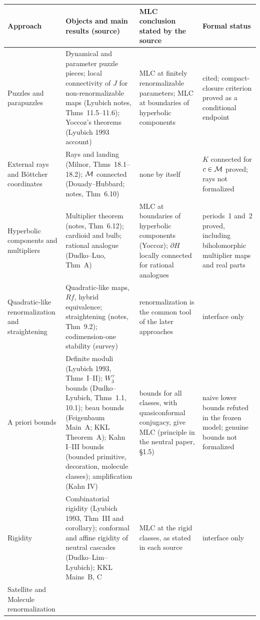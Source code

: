 \begin{table}[ht]
\centering\small
\begin{tabularx}{\textwidth}{@{}>{\raggedright\arraybackslash}p{}>{\raggedright\arraybackslash}X>{\raggedright\arraybackslash}p{}>{\raggedright\arraybackslash}p{}@{}}
\textbf{Approach} & \textbf{Objects and main results (source)} & \textbf{MLC conclusion stated by the source} & \textbf{Formal status}\\
\hline
Puzzles and parapuzzles &
Dynamical and parameter puzzle pieces; local connectivity of $J$ for non-renormalizable maps (Lyubich notes, Thms~11.5--11.6); Yoccoz's theorems (Lyubich 1993 account) &
MLC at finitely renormalizable parameters; MLC at boundaries of hyperbolic components &
cited; compact-closure criterion proved as a conditional endpoint\\
External rays and B\"ottcher coordinates &
Rays and landing (Milnor, Thms~18.1--18.2); $\mathcal M$ connected (Douady--Hubbard; notes, Thm~6.10) &
none by itself &
$K$ connected for $c\in\mathcal M$ proved; rays not formalized\\
Hyperbolic components and multipliers &
Multiplier theorem (notes, Thm~6.12); cardioid and bulb; rational analogue (Dudko--Luo, Thm~A) &
MLC at boundaries of hyperbolic components (Yoccoz); $\partial H$ locally connected for rational analogues &
periods~1 and~2 proved, including biholomorphic multiplier maps and real parts\\
Quadratic-like renormalization and straightening &
Quadratic-like maps, $Rf$, hybrid equivalence; straightening (notes, Thm~9.2); codimension-one stability (survey) &
renormalization is the common tool of the later approaches &
interface only\\
A priori bounds &
Definite moduli (Lyubich 1993, Thms~I--II); $W^+_3$ bounds (Dudko--Lyubich, Thms~1.1, 10.1); beau bounds (Feigenbaum Main~A; KKL Theorem~A); Kahn I--III bounds (bounded primitive, decoration, molecule classes); amplification (Kahn IV) &
bounds for all classes, with quasiconformal conjugacy, give MLC (principle in the neutral paper, \S1.5) &
naive lower bounds refuted in the frozen model; genuine bounds not formalized\\
Rigidity &
Combinatorial rigidity (Lyubich 1993, Thm~III and corollary); conformal and affine rigidity of neutral cascades (Dudko--Lim--Lyubich); KKL Mains~B, C &
MLC at the rigid classes, as stated in each source &
interface only\\
Satellite and Molecule renormalization &

\end{tabularx}
\end{table}
